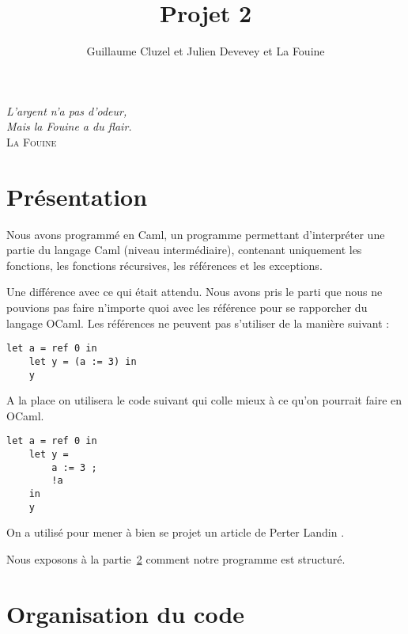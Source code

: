 \documentclass[11pt,a4paper]{article}
\author{Guillaume Cluzel et Julien Devevey et La Fouine}
\title{Projet 2}
\begin{document}
\maketitle

\begin{flushright}
\textit{L'argent n'a pas d'odeur, \\
Mais la Fouine a du flair.} \\
\textsc{La Fouine}
\end{flushright}



\section{Présentation}

Nous avons programmé en Caml, un programme permettant d'interpréter une partie du langage Caml (niveau intermédiaire), contenant uniquement les fonctions, les fonctions récursives, les références et les exceptions.

Une différence avec ce qui était attendu. Nous avons pris le parti que nous ne pouvions pas faire n'importe quoi avec les référence pour se rapporcher du langage OCaml.
Les références ne peuvent pas s'utiliser de la manière suivant :
\begin{verbatim}
let a = ref 0 in
    let y = (a := 3) in
    y
\end{verbatim}

A la place on utilisera le code suivant qui colle mieux à ce qu'on pourrait faire en OCaml.
\begin{verbatim}
let a = ref 0 in
    let y = 
        a := 3 ; 
        !a 
    in
    y
\end{verbatim}

On a utilisé pour mener à bien se projet un article de Perter Landin \cite{DBLP:journals/cacm/Landin66}.



Nous exposons à la partie~\ref{s:orga} comment notre programme est structuré.




\section{Organisation du code}
\label{s:orga}
\end{document}
